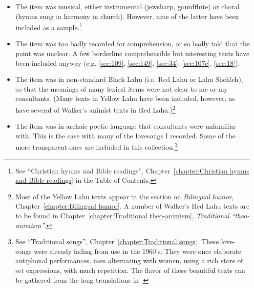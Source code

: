 \begin{itemize}
\item The item was musical, either instrumental (jewsharp, gourdflute)
  or choral (hymns sung in harmony in church). However,
  nine of the latter have been included as a sample.\footnote{See ``Christian
    hymns and Bible readings'', Chapter~\ref{chapter:Christian hymns
      and Bible readings} in the Table of Contents.}

\item The item was too badly recorded for comprehension, or so badly
  told that the point was unclear. A few borderline comprehensible but
  interesting texts have been included anyway
  (e.g. \ref{sec:109}, \ref{sec:149}, \ref{sec:34}, \ref{sec:107c}, \ref{sec:18}).

\item The item was in non-standard Black Lahu (i.e. Red Lahu or Lahu
  Shehleh), so that the meanings of many lexical items were not clear
  to me or my consultants. (Many texts in Yellow Lahu have been
  included, however, as have several of Walker's animist texts in Red
  Lahu.)\footnote{Most of the Yellow Lahu texts appear in the section
    on \emph{Bilingual humor}, Chapter~\ref{chapter:Bilingual humor}. A number of Walker's Red Lahu texts
    are to be found in Chapter~\ref{chapter:Traditional theo-animism}, \emph{Traditional
      ``theo-animism''}.}

\item
  The item was in archaic poetic language that consultants were
  unfamiliar with. This is the case with many of the lovesongs I recorded.
  Some of the more transparent ones are included in this collection.\footnote{See
    ``Traditional songs'', Chapter~\ref{chapter:Traditional songs}. These love-songs were already
    fading from use in the 1960's. They were once elaborate antiphonal
    performances, men alternating with women, using a rich store of set
    expressions, with much repetition. The flavor of these beautiful texts
    can be gathered from the long translations in \citet[][pp. 151-174]{y13}.}
\end{itemize}

